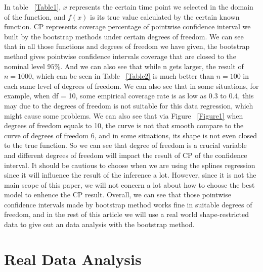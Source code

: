 \documentclass[12pt]{article}
\begin{document}
In table ~\ref{Table1}, \(x\) represents the certain time point we selected in the domain of the function, and \(f(x)\) is its true value calculated by the certain known function. CP represents coverage percentage of pointwise confidence interval we built by the bootstrap methods under certain degrees of freedom. We can see that in all those functions and degrees of freedom we have given, the bootstrap method gives pointwise confidence intervals coverage that are closed to the nominal level \(95\%\). And we can also see that while n gets larger, the result of \(n = 1000\), which can be seen in Table ~\ref{Table2} is much better than \(n = 100\) in each same level of degrees of freedom. We can also see that in some situations, for example, when df = 10, some empirical coverage rate is as low as 0.3 to 0.4, this may due to the degrees of freedom is not suitable for this data regression, which might cause some problems. We can also see that via Figure ~\ref{Figure1} when degrees of freedom equals to 10, the curve is not that smooth compare to the curve of degrees of freedom 6, and in some situations, its shape is not even closed to the true function. So we can see that degree of freedom is a crucial variable and different degrees of freedom will impact the result of CP of the confidence interval. It should be cautious to choose when we are using the splines regression since it will influence the result of the inference a lot. However, since it is not the main scope of this paper, we will not concern a lot about how to choose the best model to enhence the CP result. Overall, we can see that those pointwise confidence intervals made by bootstrap method works fine in suitable degrees of freedom, and in the rest of this article we will use a real world shape-restricted data to give out an data analysis with the bootstrap method.











\section{Real Data Analysis}
\label{Real Data Analysis}
\end{document}
